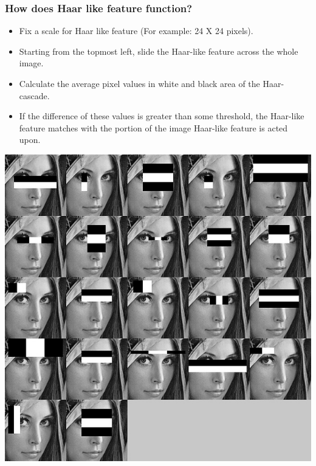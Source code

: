\documentclass[•]{beamer}
\begin{document}
\begin{frame}
\frametitle{How does Haar like feature function?}
\begin{itemize}
\item<1->{Fix a scale for Haar like feature (For example: 24 X 24 pixels).}
\item<2->{Starting from the topmost left, slide the Haar-like feature across the whole image.}
\item<3->{Calculate the average pixel values in white and black area of the Haar-cascade.}
\item<4->{If the difference of these values is greater than some threshold, the Haar-like feature matches with the portion of the image Haar-like feature is acted upon.}
\end{itemize}
\centering\includegraphics[scale=0.16]{Haar_cascaded.png}
\end{frame}
\end{document}
